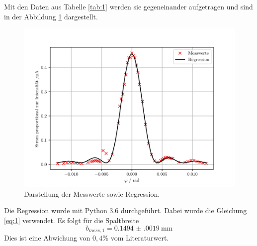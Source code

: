 Mit den Daten aus Tabelle \ref{tab:1} werden sie gegeneinander aufgetragen und sind in der Abbildung
\ref{abb:4} dargestellt.
\begin{figure}[H]
  \centering
  \includegraphics{plot1.pdf}
  \caption{Darstellung der Messwerte sowie Regression.}
  \label{abb:4}
\end{figure}
Die Regression wurde mit Python 3.6 durchgeführt.
Dabei wurde die Gleichung  \ref{eq:1} verwendet.
Es folgt für die Spaltbreite
\begin{equation*}
  b_{mess,1} = \SI{0.1494(0019)}{\milli\metre}
\end{equation*}
Dies ist eine Abwichung von $0,4\%$ vom Literaturwert.
